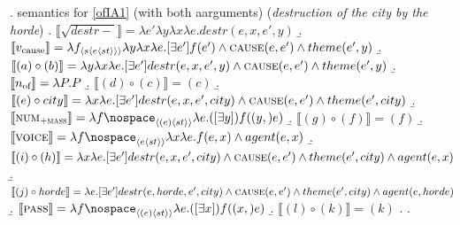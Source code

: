 \documentclass[12pt]{article}
\newcommand*{\textsub}[1]{\ensuremath{_\textrm{{\scriptsize #1}}}}
\begin{document}
\ex. \label{ofIAsem1} semantics for \ref{ofIA1} (with both aarguments) (\textit{destruction of the city by the horde})
\a. \begin{math}\llbracket\sqrt{destr-}\rrbracket = \lambda e' \lambda y \lambda x \lambda e . destr(e,x,e',y)\end{math}
\b. \begin{math}\llbracket v\textsub{cause}\rrbracket = \lambda f_{\langle s\langle e \langle st \rangle \rangle \rangle} \lambda y \lambda x \lambda e . [\exists e']f(e') \land \textsc{cause}(e,e') \land theme(e',y)\end{math}
\b. \begin{math}\llbracket (a) \circ (b) \rrbracket = \lambda y \lambda x \lambda e . [\exists e'] destr(e,x,e',y) \land \textsc{cause}(e,e') \land theme(e',y) \end{math}
\b. \begin{math} \llbracket n\textsub{of} \rrbracket = \lambda P.P \end{math}
\b. \begin{math}\llbracket (d) \circ (c) \rrbracket = (c)\end{math}
\b. \begin{math}\llbracket (e) \circ city \rrbracket =\lambda x \lambda e . [\exists e'] destr(e,x,e',city) \land \textsc{cause}(e,e') \land theme(e',city) \end{math}
\b. \begin{math}\llbracket \textsc{num}\textsub{\textsc{+mass}} \rrbracket =\lambda f\nospace_{\langle (e) \langle st \rangle \rangle}\lambda e . ([\exists y]) f((y,)e) \end{math}
\b. \begin{math}\llbracket (g) \circ (f) \rrbracket = (f)\end{math}
\b. \begin{math} \llbracket \textsc{voice} \rrbracket = \lambda f \nospace_{\langle e \langle st \rangle \rangle } \lambda x \lambda e . f(e,x) \land agent(e,x) \end{math}
\b. \begin{math}\llbracket (i) \circ (h) \rrbracket = \lambda x \lambda e . [\exists e'] destr(e,x,e',city) \land \textsc{cause}(e,e') \land theme(e',city) \land agent(e,x) \end{math}
\b. \begin{math}\llbracket (j) \circ horde \rrbracket = \lambda e . [\exists e'] destr(e,horde,e',city) \land \textsc{cause}(e,e') \land theme(e',city) \land agent(e,horde) \end{math}
\b. \begin{math}\llbracket \textsc{pass} \rrbracket = \lambda f\nospace_{\langle (e) \langle st \rangle \rangle}\lambda e . ([\exists x]) f((x,)e) \end{math}
\b. \begin{math}\llbracket (l) \circ (k) \rrbracket = (k)\end{math}
\z. \z. \par
\end{document}

